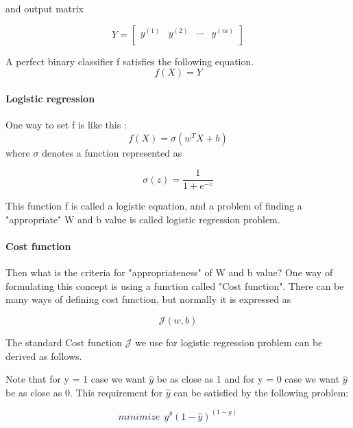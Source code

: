 and output matrix

\begin{equation}
Y = 
    \begin{bmatrix}
        y^{(1)}  & y^{(2)} & \cdots & y^{(m)} \\

    \end{bmatrix}
\end{equation}

A perfect binary classifier f satisfies the following equation.
\begin{equation}
f(X) = Y
\end{equation}



\paragraph{Logistic regression} One way to set f is like this : 
\begin{equation}
f(X) = \sigma(w^TX + b)
\end{equation}
where $\sigma$ denotes a function represented as


\begin{equation} 
\sigma(z) = \frac{1}{1 + e^{-z}}
\end{equation}

This function f is called a logistic equation, and a problem of finding a "appropriate" W and b value is called logistic regression problem.

\paragraph{Cost function} Then what is the criteria for "appropriateness" of W and b value? One way of formulating this concept is using a function called "Cost function". There can be many ways of defining cost function, but normally it is expressed as 

\begin{equation} 
    \mathcal{J}(w, b)
\end{equation}

The standard Cost function $\mathcal{J}$ we use for logistic regression problem can be derived as follows.

Note that for y = 1 case we want $\hat{y}$ be as close as 1 and for y = 0 case we want $\hat{y}$ be as close as 0. This requirement for  $\hat{y}$ can be satisfied by the following problem:

\begin{equation} 
    minimize \: \: \hat{y}^y(1-\hat{y})^{(1-y)} 
\end{equation}

